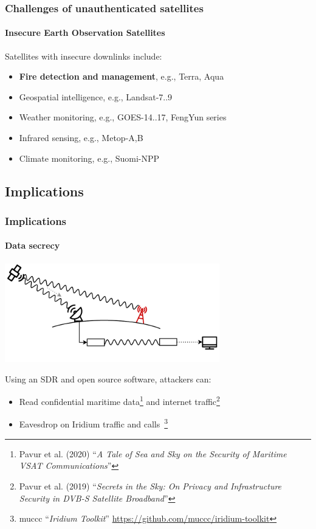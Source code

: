 \documentclass[aspectratio=169]{beamer}
\begin{document}
\begin{frame}
  \frametitle{Challenges of unauthenticated satellites}
  \framesubtitle{Insecure Earth Observation Satellites}

  Satellites with insecure downlinks include:

  \begin{itemize}
    \item \textbf{Fire detection and management}, e.g., Terra, Aqua
    \pause
    \item Geospatial intelligence, e.g., Landsat-7..9
    \item Weather monitoring, e.g., GOES-14..17, FengYun series
    \item Infrared sensing, e.g., Metop-A,B
    \item Climate monitoring, e.g., Suomi-NPP
  \end{itemize}
\end{frame}

\subsection{Implications}

\def\footnoterule{\only<3->\oldfootnoterule}
\begin{frame}
  \frametitle{Implications}
  \framesubtitle{Data secrecy}

  \begin{center}
    \includegraphics[width=0.7\textwidth]{images/eavesdropping_illustration.pdf}
  \end{center}

  \pause
  \vspace{-0.7cm}

  Using an SDR and open source software, attackers can:
  \pause
  \begin{itemize}[<+->]
    \item Read confidential maritime data\footnote<3->[1]{Pavur et al. (2020) ``\textit{A Tale of Sea and Sky on the Security of Maritime VSAT Communications}''} and internet traffic\footnote<3->[2]{Pavur et al. (2019) ``\textit{Secrets in the Sky: On Privacy and Infrastructure Security in DVB-S Satellite Broadband}''}
    \item Eavesdrop on Iridium traffic and calls~\footnote<4->[3]{muccc ``\textit{Iridium Toolkit}'' \url{https://github.com/muccc/iridium-toolkit}}
  \end{itemize}
\end{frame}
\end{document}
